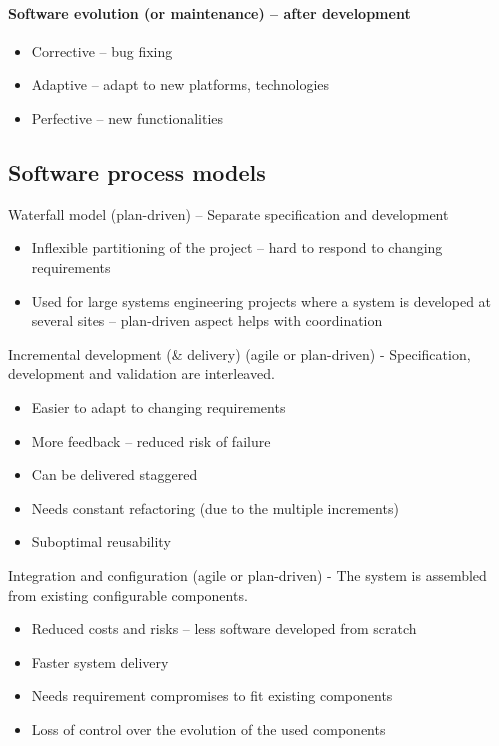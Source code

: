 \documentclass[../ESOF_notes.tex]{subfiles}
\begin{document}
\paragraph{Software evolution (or maintenance) – after development}
\begin{itemize}
    \item Corrective – bug fixing
    \item Adaptive – adapt to new platforms, technologies
    \item Perfective – new functionalities
\end{itemize}

\subsection{Software process models}
Waterfall model (plan-driven) – Separate specification and development

\begin{itemize}
    \item Inflexible partitioning of the project – hard to respond to changing requirements
    \item Used for large systems engineering projects where a system is developed at several sites – plan-driven aspect helps with coordination
\end{itemize}

Incremental development (\& delivery) (agile or plan-driven) - Specification, development and validation are interleaved.

\begin{itemize}
    \item Easier to adapt to changing requirements
    \item More feedback – reduced risk of failure
    \item Can be delivered staggered
    \item Needs constant refactoring (due to the multiple increments)
    \item Suboptimal reusability
\end{itemize}
Integration and configuration (agile or plan-driven) - The system is assembled from existing configurable components.

\begin{itemize}
    \item Reduced costs and risks – less software developed from scratch
    \item Faster system delivery
    \item Needs requirement compromises to fit existing components
    \item Loss of control over the evolution of the used components
\end{itemize}
\end{document}
